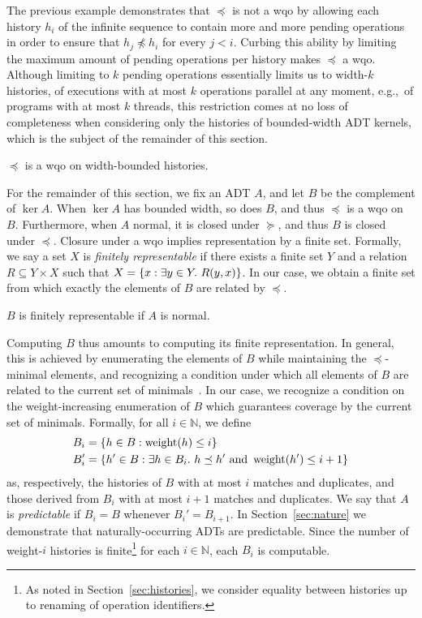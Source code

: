 The previous example demonstrates that $\preceq$ is not a wqo by allowing each
history $h_i$ of the infinite sequence to contain more and more pending
operations in order to ensure that $h_j \not\preceq h_i$ for every $j < i$.
Curbing this ability by limiting the maximum amount of pending operations per
history makes $\preceq$ a wqo. Although limiting to $k$ pending operations
essentially limits us to width-$k$ histories, of executions with at most $k$
operations parallel at any moment, e.g.,~of programs with at most $k$ threads,
this restriction comes at no loss of completeness when considering only the
histories of bounded-width ADT kernels, which is the subject of the remainder
of this section.

\begin{lemma}

  $\preceq$ is a wqo on width-bounded histories.

\end{lemma}

For the remainder of this section, we fix an ADT $A$, and let $B$ be the
complement of $\ker A$. When $\ker A$ has bounded width, so does $B$, and thus
$\preceq$ is a wqo on $B$. Furthermore, when $A$ normal, it is closed under
$\succeq$, and thus $B$ is closed under $\preceq$. Closure under a wqo implies
representation by a finite set. Formally, we say a set $X$ is \emph{finitely
representable} if there exists a finite set $Y$ and a relation $R \subseteq Y
\times X$ such that $X = {\{{ x : \exists y\in Y.\ R(y,x) }\}}$. In our case, we
obtain a finite set from which exactly the elements of $B$ are related by
$\preceq$.

\begin{lemma}

  $B$ is finitely representable if $A$ is normal.

\end{lemma}

Computing $B$ thus amounts to computing its finite representation. In general,
this is achieved by enumerating the elements of $B$ while maintaining the
$\preceq$-minimal elements, and recognizing a condition under which all
elements of $B$ are related to the current set of
minimals~\cite{conf/lics/AbdullaCJT96, journals/tcs/FinkelS01}. In our case, we
recognize a condition on the weight-increasing enumeration of $B$ which
guarantees coverage by the current set of minimals. Formally, for all $i \in
\mathbb{N}$, we define
\begin{align*}
  B_i &= {\{{ h \in B : \operatorname{weight}(h) \le i }\}} \\
  B_i' &= {\{{ h' \in B :
    \exists h \in B_i.\ h \preceq h' \text{ and } \operatorname{weight}(h') \le i+1
  }\}}
\end{align*}
as, respectively, the histories of $B$ with at most $i$ matches and duplicates,
and those derived from $B_i$ with at most $i\!+\!1$ matches and duplicates. We
say that $A$ is \emph{predictable} if $B_i = B$ whenever $B_i' = B_{i+1}$. In
Section~\ref{sec:nature} we demonstrate that naturally-occurring ADTs are
predictable. Since the number of weight-$i$ histories is finite\footnote{As
noted in Section~\ref{sec:histories}, we consider equality between histories up
to renaming of operation identifiers.} for each $i \in \mathbb{N}$, each $B_i$
is computable.

